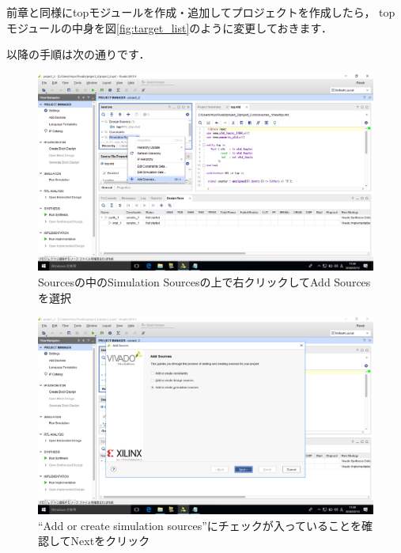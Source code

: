\documentclass[a4paper,dvipdfmx]{jsarticle}
\begin{document}
前章と同様にtopモジュールを作成・追加してプロジェクトを作成したら，
topモジュールの中身を図\ref{fig:target_list}のように変更しておきます．

以降の手順は次の通りです．

 \begin{figure}[H]
  \begin{center}
   \includegraphics[width=.8\textwidth]{chapter04_figures/VirtualBox_Windows10_19_03_2018_11_59_46.png}
  \end{center}
  \caption{Sourcesの中のSimulation Sourcesの上で右クリックしてAdd Sourcesを選択}
 \end{figure}

 \begin{figure}[H]
  \begin{center}
   \includegraphics[width=.8\textwidth]{chapter04_figures/VirtualBox_Windows10_19_03_2018_11_59_52.png}
  \end{center}
  \caption{``Add or create simulation sources''にチェックが入っていることを確認してNextをクリック}
 \end{figure}
\end{document}
